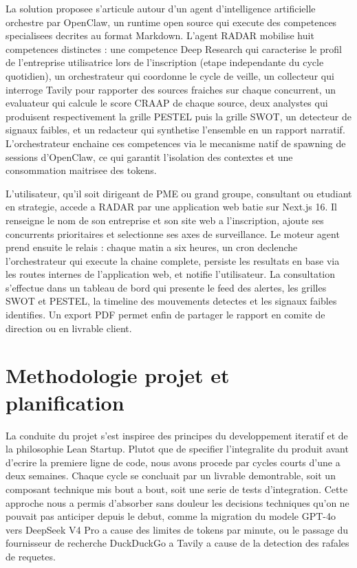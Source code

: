 \documentclass[12pt,a4paper,openany]{report}
\begin{document}
La solution proposee s'articule autour d'un agent d'intelligence artificielle orchestre par OpenClaw, un runtime open source qui execute des competences specialisees decrites au format Markdown. L'agent RADAR mobilise huit competences distinctes : une competence Deep Research qui caracterise le profil de l'entreprise utilisatrice lors de l'inscription (etape independante du cycle quotidien), un orchestrateur qui coordonne le cycle de veille, un collecteur qui interroge Tavily pour rapporter des sources fraiches sur chaque concurrent, un evaluateur qui calcule le score CRAAP de chaque source, deux analystes qui produisent respectivement la grille PESTEL puis la grille SWOT, un detecteur de signaux faibles, et un redacteur qui synthetise l'ensemble en un rapport narratif. L'orchestrateur enchaine ces competences via le mecanisme natif de spawning de sessions d'OpenClaw, ce qui garantit l'isolation des contextes et une consommation maitrisee des tokens.

L'utilisateur, qu'il soit dirigeant de PME ou grand groupe, consultant ou etudiant en strategie, accede a RADAR par une application web batie sur Next.js 16. Il renseigne le nom de son entreprise et son site web a l'inscription, ajoute ses concurrents prioritaires et selectionne ses axes de surveillance. Le moteur agent prend ensuite le relais : chaque matin a six heures, un cron declenche l'orchestrateur qui execute la chaine complete, persiste les resultats en base via les routes internes de l'application web, et notifie l'utilisateur. La consultation s'effectue dans un tableau de bord qui presente le feed des alertes, les grilles SWOT et PESTEL, la timeline des mouvements detectes et les signaux faibles identifies. Un export PDF permet enfin de partager le rapport en comite de direction ou en livrable client.


\section{Methodologie projet et planification}
\label{sec:methodologie}

La conduite du projet s'est inspiree des principes du developpement iteratif et de la philosophie Lean Startup. Plutot que de specifier l'integralite du produit avant d'ecrire la premiere ligne de code, nous avons procede par cycles courts d'une a deux semaines. Chaque cycle se concluait par un livrable demontrable, soit un composant technique mis bout a bout, soit une serie de tests d'integration. Cette approche nous a permis d'absorber sans douleur les decisions techniques qu'on ne pouvait pas anticiper depuis le debut, comme la migration du modele GPT-4o vers DeepSeek V4 Pro a cause des limites de tokens par minute, ou le passage du fournisseur de recherche DuckDuckGo a Tavily a cause de la detection des rafales de requetes.
\end{document}
